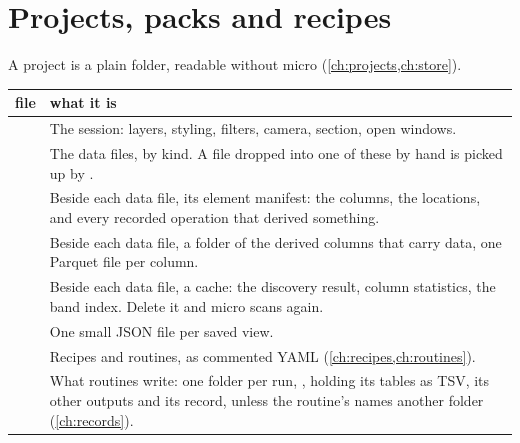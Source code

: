 \section{Projects, packs and recipes}\label{sec:formats-projects}

A project is a plain folder, readable without micro (\cref{ch:projects,ch:store}).

\begin{tabularx}{\linewidth}{@{}p{38mm}L@{}}
\toprule
file & what it is \\
\midrule
{} & The session: layers, styling, filters, camera, section, open windows. \\
       &
  The data files, by kind. A file dropped into one of these by hand is picked up by
  . \\
 & Beside each data file, its element manifest: the columns, the locations, and every recorded
  operation that derived something. \\
 & Beside each data file, a folder of the derived columns that carry data, one Parquet file per column. \\
 & Beside each data file, a cache: the discovery result, column statistics, the band index.
  Delete it and micro scans again. \\
  & One small JSON file per saved view. \\
 & Recipes and routines, as commented YAML (\cref{ch:recipes,ch:routines}). \\
 & What routines write: one folder per run, ,
  holding its tables as TSV, its other outputs and its  record, unless the routine's
   names another folder (\cref{ch:records}). \\
\bottomrule
\end{tabularx}

